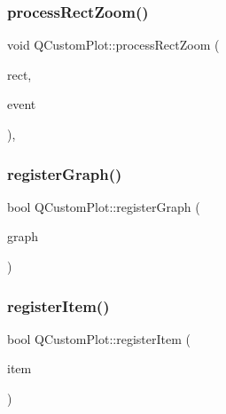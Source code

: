 \subsubsection{\texorpdfstring{processRectZoom()}{processRectZoom()}}
{\footnotesize\ttfamily void Q\+Custom\+Plot\+::process\+Rect\+Zoom (\begin{DoxyParamCaption}\item[{Q\+Rect}]{rect,  }\item[{Q\+Mouse\+Event $\ast$}]{event }\end{DoxyParamCaption})\hspace{0.3cm}{\ttfamily [protected]}, {\ttfamily [virtual]}}

\mbox{\label{class_q_custom_plot_acfc01230bddaea4f1782e4aa7d130af6}} 
\subsubsection{\texorpdfstring{registerGraph()}{registerGraph()}}
{\footnotesize\ttfamily bool Q\+Custom\+Plot\+::register\+Graph (\begin{DoxyParamCaption}\item[{\mbox{\hyperlink{class_q_c_p_graph}{Q\+C\+P\+Graph}} $\ast$}]{graph }\end{DoxyParamCaption})\hspace{0.3cm}{\ttfamily [protected]}}

\mbox{\label{class_q_custom_plot_afbd4010b2e3f364c8d512691b2a1640a}} 
\subsubsection{\texorpdfstring{registerItem()}{registerItem()}}
{\footnotesize\ttfamily bool Q\+Custom\+Plot\+::register\+Item (\begin{DoxyParamCaption}\item[{\mbox{\hyperlink{class_q_c_p_abstract_item}{Q\+C\+P\+Abstract\+Item}} $\ast$}]{item }\end{DoxyParamCaption})\hspace{0.3cm}{\ttfamily [protected]}}

\mbox{\label{class_q_custom_plot_aeba7733bb9fadfb5a375b3f40de9e58a}} 
